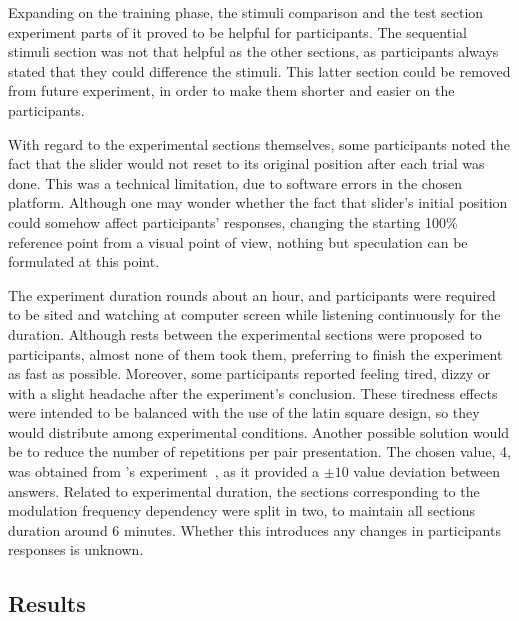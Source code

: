 \documentclass[../main.tex]{subfiles}
\begin{document}
Expanding on the training phase, the stimuli comparison and the test section
experiment parts of it proved to be helpful for participants. The sequential
stimuli section was not that helpful as the other sections, as participants
always stated that they could difference the stimuli. This latter section
could be removed from future experiment, in order to make them shorter and
easier on the participants.

With regard to the experimental sections themselves, some participants noted
the fact that the slider would not reset to its original position after each
trial was done. This was a technical limitation, due to software errors in the
chosen platform. Although one may wonder whether the fact that slider's initial
position could somehow affect participants' responses, changing the starting
100\% reference point from a visual point of view, nothing but speculation
can be formulated at this point.

The experiment duration rounds about an hour, and participants were required to
be sited and watching at computer screen while listening continuously for the
duration. Although rests between the experimental sections were proposed to
participants, almost none of them took them, preferring to finish the experiment
as fast as possible. Moreover, some participants reported feeling tired, dizzy
or with a slight headache after the experiment's conclusion. These tiredness
effects were intended to be balanced with the use of the latin square design,
so they would distribute among experimental conditions. Another possible
solution would be to reduce the number of repetitions per pair presentation.
The chosen value, 4, was obtained from \citeauthor{Fastl1982Fluctuation}'s
experiment~\cite{Fastl1982Fluctuation}, as it provided a $\pm10$ value deviation
between answers. Related to experimental duration, the sections corresponding to
the modulation frequency dependency were split in two, to maintain all sections
duration around 6 minutes. Whether this introduces any changes in participants
responses is unknown.

\subsection{Results}
\end{document}
